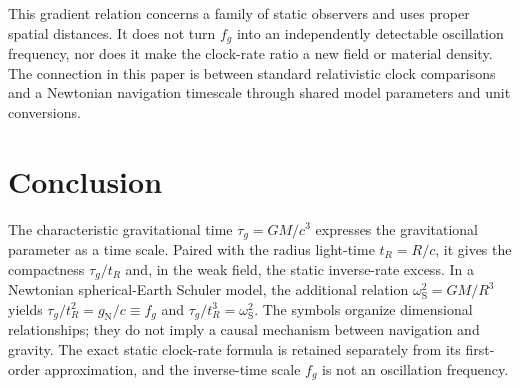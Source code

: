 \documentclass[12pt]{article}
\begin{document}
This gradient relation concerns a family of static observers and uses proper spatial distances. It does not turn $f_g$ into an independently detectable oscillation frequency, nor does it make the clock-rate ratio a new field or material density. The connection in this paper is between standard relativistic clock comparisons and a Newtonian navigation timescale through shared model parameters and unit conversions.

\section{Conclusion}

The characteristic gravitational time $\tau_g=GM/c^3$ expresses the gravitational parameter as a time scale. Paired with the radius light-time $t_R=R/c$, it gives the compactness $\tau_g/t_R$ and, in the weak field, the static inverse-rate excess. In a Newtonian spherical-Earth Schuler model, the additional relation $\omega_{\mathrm{S}}^2=GM/R^3$ yields $\tau_g/t_R^2=g_{\mathrm{N}}/c\equiv f_g$ and $\tau_g/t_R^3=\omega_{\mathrm{S}}^2$. The symbols organize dimensional relationships; they do not imply a causal mechanism between navigation and gravity. The exact static clock-rate formula is retained separately from its first-order approximation, and the inverse-time scale $f_g$ is not an oscillation frequency.
\end{document}

